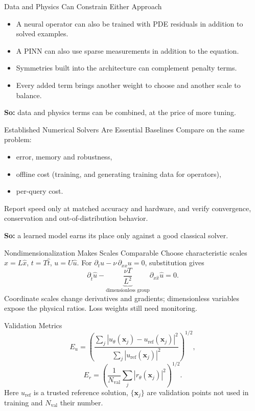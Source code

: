 \documentclass{ntuabeamer}
\begin{document}
\begin{frame}{Data and Physics Can Constrain Either Approach}
  \begin{itemize}
    \item A neural operator can also be trained with PDE residuals in addition to solved examples.
    \item A PINN can also use sparse measurements in addition to the equation.
    \item Symmetries built into the architecture can complement penalty terms.
    \item Every added term brings another weight to choose and another scale to balance.
  \end{itemize}
  \textbf{So:} data and physics terms can be combined, at the price of more tuning.
\end{frame}

\begin{frame}{Established Numerical Solvers Are Essential Baselines}
  Compare on the same problem:
  \begin{itemize}
    \item error, memory and robustness,
    \item offline cost (training, and generating training data for operators),
    \item per-query cost.
  \end{itemize}
  Report speed only at matched accuracy and hardware, and verify convergence, conservation and out-of-distribution behavior.

  \medskip
  \textbf{So:} a learned model earns its place only against a good classical solver.
\end{frame}

\appendix
{}

\begin{frame}{Nondimensionalization Makes Scales Comparable}
  Choose characteristic scales \(x=L\widehat x\), \(t=T\widehat t\), \(u=U\widehat u\). For \(\partial_tu-\nu\,\partial_{xx}u=0\), substitution gives
  \[
    \partial_{\widehat t}\widehat u-\underbrace{\frac{\nu T}{L^2}}_{\text{dimensionless group}}\partial_{\widehat x\widehat x}\widehat u=0.
  \]
  Coordinate scales change derivatives and gradients; dimensionless variables expose the physical ratios. Loss weights still need monitoring.
\end{frame}

\begin{frame}{Validation Metrics}
  \[
    E_u=\left(\frac{\sum_j|u_\theta(\mathbf x_j)-u_{\mathrm{ref}}(\mathbf x_j)|^2}{\sum_j|u_{\mathrm{ref}}(\mathbf x_j)|^2}\right)^{1/2},
  \]
  \[
    E_r=\left(\frac1{N_{\mathrm{val}}}\sum_j|r_\theta(\mathbf x_j)|^2\right)^{1/2}.
  \]
  Here \(u_{\mathrm{ref}}\) is a trusted reference solution, \(\{\mathbf x_j\}\) are validation points not used in training and \(N_{\mathrm{val}}\) their number.
\end{frame}
\end{document}

